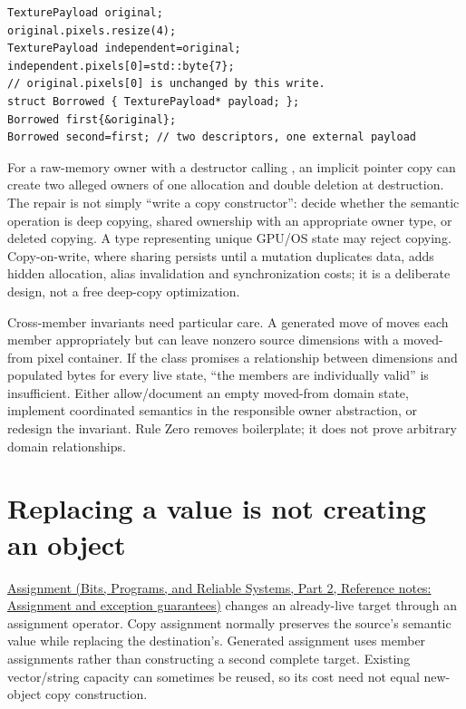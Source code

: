 \begin{verbatim}
TexturePayload original;
original.pixels.resize(4);
TexturePayload independent=original;
independent.pixels[0]=std::byte{7};
// original.pixels[0] is unchanged by this write.
struct Borrowed { TexturePayload* payload; };
Borrowed first{&original};
Borrowed second=first; // two descriptors, one external payload
\end{verbatim}

For a raw-memory owner with a destructor calling , an implicit pointer copy can create two alleged owners of one allocation and double deletion at destruction. The repair is not simply ``write a copy constructor'': decide whether the semantic operation is deep copying, shared ownership with an appropriate owner type, or deleted copying. A type representing unique GPU/OS state may reject copying. Copy-on-write, where sharing persists until a mutation duplicates data, adds hidden allocation, alias invalidation and synchronization costs; it is a deliberate design, not a free deep-copy optimization.

Cross-member invariants need particular care. A generated move of  moves each member appropriately but can leave nonzero source dimensions with a moved-from pixel container. If the class promises a relationship between dimensions and populated bytes for every live state, ``the members are individually valid'' is insufficient. Either allow/document an empty moved-from domain state, implement coordinated semantics in the responsible owner abstraction, or redesign the invariant. Rule Zero removes boilerplate; it does not prove arbitrary domain relationships.

\section{Replacing a value is not creating an object}\label{05-engine-i-ch003-replacing-a-value-is-not-creating-an-object}

\hypertarget{05-engine-i-ch003-replacing-a-value-is-not-creating-an-object}{}

\href{../01-Bits-Programs-and-Reliable-Systems-P02/main.pdf\#nameddest=appendix-bea6beb5350f}{Assignment (Bits, Programs, and Reliable Systems, Part 2, Reference notes: Assignment and exception guarantees)} changes an already-live target through an assignment operator. Copy assignment normally preserves the source's semantic value while replacing the destination's. Generated assignment uses member assignments rather than constructing a second complete target. Existing vector/string capacity can sometimes be reused, so its cost need not equal new-object copy construction.

